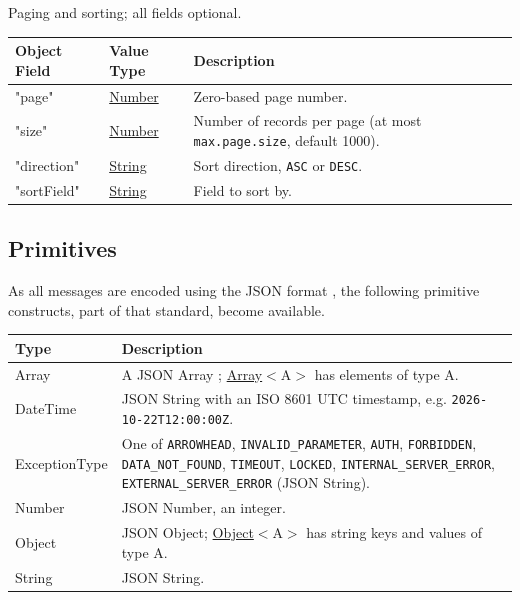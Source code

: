 \documentclass[a4paper]{arrowhead}
\newcommand{\pdef}[1]{{\textcolor{ArrowheadGrey}{#1 \label{sec:model:primitives:#1} \label{sec:model:primitives:#1s}}}}
\newcommand{\pref}[1]{{\textcolor{ArrowheadGrey}{\hyperref[sec:model:primitives:#1]{#1}}}}
\begin{document}

Paging and sorting; all fields optional.


\noindent\begin{tabularx}{\textwidth}{| >{\raggedright\arraybackslash}p{3.9cm} | >{\raggedright\arraybackslash\small}p{5.3cm} | X |} \hline
\rowcolor{gray!33} Object Field & Value Type & Description \\ \hline
"page" & \pref{Number} & Zero-based page number. \\ \hline
"size" & \pref{Number} & Number of records per page (at most \texttt{max.\allowbreak{}page.\allowbreak{}size}, default 1000). \\ \hline
"direction" & \pref{String} & Sort direction, \texttt{ASC} or \texttt{DESC}. \\ \hline
"sort\allowbreak{}Field" & \pref{String} & Field to sort by. \\ \hline
\end{tabularx}



\subsection{Primitives}
\label{sec:model:primitives}

As all messages are encoded using the JSON format \cite{rfc8259}, the following primitive constructs, part of that standard, become available.

\noindent\begin{tabularx}{\textwidth}{| p{4.6cm} | X |} \hline
\rowcolor{gray!33} Type & Description \\ \hline
\pdef{Array} & A JSON Array \cite{rfc8259}; \pref{Array}$<$A$>$ has elements of type A. \\ \hline
\pdef{DateTime} & JSON String with an ISO 8601 UTC timestamp, e.g. \texttt{2026-10-22T12:00:00Z}. \\ \hline
\pdef{ExceptionType} & One of \texttt{ARROWHEAD}, \texttt{INVALID\_\allowbreak{}PARAMETER}, \texttt{AUTH}, \texttt{FORBIDDEN}, \texttt{DATA\_\allowbreak{}NOT\_\allowbreak{}FOUND}, \texttt{TIMEOUT}, \texttt{LOCKED}, \texttt{INTERNAL\_\allowbreak{}SERVER\_\allowbreak{}ERROR}, \texttt{EXTERNAL\_\allowbreak{}SERVER\_\allowbreak{}ERROR} (JSON String). \\ \hline
\pdef{Number} & JSON Number, an integer. \\ \hline
\pdef{Object} & JSON Object; \pref{Object}$<$A$>$ has string keys and values of type A. \\ \hline
\pdef{String} & JSON String. \\ \hline
\end{tabularx}
\end{document}
